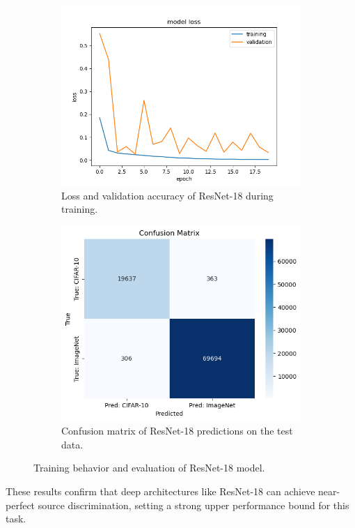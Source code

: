 \begin{figure}[H]
    \centering
    \begin{subfigure}[b]{0.48\textwidth}
        \centering
        \includegraphics[width=\textwidth]{Plots/ModelsAndResults/ResNet18_Loss.png}
        \caption{Loss and validation accuracy of ResNet-18 during training.}
        \label{fig:ResNet18_loss_plot}
    \end{subfigure}
    \hfill
    \begin{subfigure}[b]{0.48\textwidth}
        \centering
        \includegraphics[width=\textwidth]{Plots/ModelsAndResults/ResNet18_confusion_matrix.png}
        \caption{Confusion matrix of ResNet-18 predictions on the test data.}
        \label{fig:ResNet18_confusion_matrix_plot}
    \end{subfigure}
    \caption{Training behavior and evaluation of ResNet-18 model.}
    \label{fig:ResNet18_combined}
\end{figure}

These results confirm that deep architectures like ResNet-18 can achieve near-perfect source discrimination, setting a strong upper performance bound for this task.